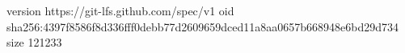 version https://git-lfs.github.com/spec/v1
oid sha256:4397f8586f8d336fff0debb77d2609659dced11a8aa0657b668948e6bd29d734
size 121233
